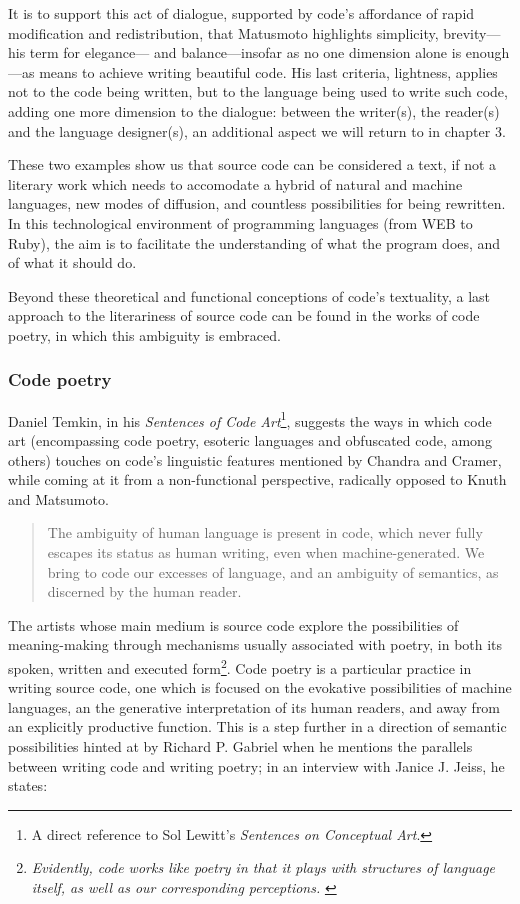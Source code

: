 It is to support this act of dialogue, supported by code's affordance of rapid modification and redistribution, that Matusmoto highlights simplicity, brevity—his term for elegance— and balance—insofar as no one dimension alone is enough—as means to achieve writing beautiful code. His last criteria, lightness, applies not to the code being written, but to the language being used to write such code, adding one more dimension to the dialogue: between the writer(s), the reader(s) and the language designer(s), an additional aspect we will return to in chapter 3.

These two examples show us that source code can be considered a text, if not a literary work which needs to accomodate a hybrid of natural and machine languages, new modes of diffusion, and countless possibilities for being rewritten. In this technological environment of programming languages (from WEB to Ruby), the aim is to facilitate the understanding of what the program does, and of what it should do.

Beyond these theoretical and functional conceptions of code's textuality, a last approach to the literariness of source code can be found in the works of code poetry, in which this ambiguity is embraced.

\subsubsection{Code poetry}
\label{subsubsec:code-poetry}

Daniel Temkin, in his \emph{Sentences of Code Art}\footnote{A direct reference to Sol Lewitt's \emph{Sentences on Conceptual Art}.}, suggests the ways in which code art (encompassing code poetry, esoteric languages and obfuscated code, among others) touches on code's linguistic features mentioned by Chandra and Cramer, while coming at it from a non-functional perspective, radically opposed to Knuth and Matsumoto.

\begin{quote}
  The ambiguity of human language is present in code, which never fully escapes its status as human writing, even when machine-generated. We bring to code our excesses of language, and an ambiguity of semantics, as discerned by the human reader. \citep{temkin_sentences_2017}
\end{quote}

The artists whose main medium is source code explore the possibilities of meaning-making through mechanisms usually associated with poetry, in both its spoken, written and executed form\footnote{\emph{Evidently, code works like poetry in that it plays with structures of language itself, as well as our corresponding perceptions.} \citep{cox_aesthetics_2011}}. Code poetry is a particular practice in writing source code, one which is focused on the evokative possibilities of machine languages, an the generative interpretation of its human readers, and away from an explicitly productive function. This is a step further in a direction of semantic possibilities hinted at by Richard P. Gabriel when he mentions the parallels between writing code and writing poetry; in an interview with Janice J. Jeiss, he states:

